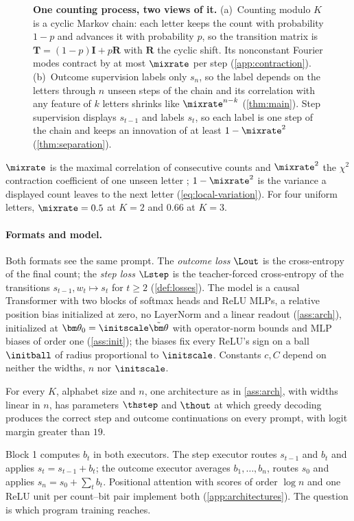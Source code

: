 \begin{figure}[t]
\centering
\resizebox{\linewidth}{!}{}
\caption{\textbf{One counting process, two views of it.}
(a)~Counting modulo $K$ is a cyclic Markov chain: each letter keeps the count with probability $1-p$ and advances it with probability
$p$, so the transition matrix is $\mathbf T=(1-p)\mathbf I+p\mathbf R$ with $\mathbf R$ the cyclic shift. Its nonconstant Fourier modes
contract by at most $\mixrate$ per step (\cref{app:contraction}).
(b)~Outcome supervision labels only $s_n$, so the label depends on the letters through $n$ unseen steps of the chain and its
correlation with any feature of $k$ letters shrinks like $\mixrate^{n-k}$ (\cref{thm:main}). Step supervision displays $s_{t-1}$ and labels $s_t$, so each label is one
step of the chain and keeps an innovation of at least $1-\mixrate^2$ (\cref{thm:separation}).}
\label{fig:chain}
\end{figure}

$\mixrate$ is the maximal correlation of consecutive counts and $\mixrate^2$ the $\chi^2$ contraction coefficient of one unseen letter
\citep{witsenhausen1975sequences,raginsky2016strong}; $1-\mixrate^2$ is the variance a displayed count leaves to the next letter
(\cref{eq:local-variation}). For four uniform letters, $\mixrate=0.5$ at $K=2$ and $0.66$ at $K=3$.

\paragraph{Formats and model.} Both formats see the same prompt. The \emph{outcome loss} $\Lout$ is the cross-entropy of the final
count; the \emph{step loss} $\Lstep$ is the teacher-forced cross-entropy of the transitions $s_{t-1},w_t\mapsto s_t$ for $t\ge2$
(\cref{def:losses}). The model is a causal Transformer with two blocks of softmax heads and ReLU MLPs, a relative position bias
initialized at zero, no LayerNorm and a linear readout (\cref{ass:arch}), initialized at $\bm\theta_0=\initscale\tilde{\bm\theta}$ with
operator-norm bounds and MLP biases of order one (\cref{ass:init}); the biases fix every ReLU's sign on a ball $\initball$ of radius
proportional to $\initscale$. Constants $c,C$ depend on neither the widths, $n$ nor $\initscale$.

\begin{proposition}
\label{prop:represent}
For every $K$, alphabet size and $n$, one architecture as in \cref{ass:arch}, with widths linear in $n$, has parameters
$\thstep$ and $\thout$ at which greedy decoding produces the correct step and outcome continuations on every prompt, with
logit margin greater than $19$.
\end{proposition}
\label{sec:exact-programs}
Block 1 computes $b_t$ in both executors. The step executor routes $s_{t-1}$ and $b_t$ and applies $s_t=s_{t-1}+b_t$; the outcome executor
averages $b_1,\ldots,b_n$, routes $s_0$ and applies $s_n=s_0+\sum_tb_t$. Positional attention with scores of order $\log n$ and one ReLU
unit per count--bit pair implement both (\cref{app:architectures}). The question is which program training reaches.

